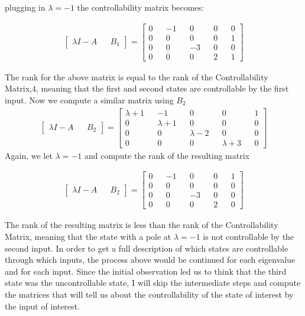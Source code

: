 \documentclass[paper=a4,margin, fontsize=11pt]{scrartcl} %
\numberwithin{equation}{section} %
\numberwithin{figure}{section} %
\numberwithin{table}{section} %
\begin{document}
plugging in $\lambda=-1$ the controllability matrix becomes:

\begin{align*}
\begin{bmatrix}\lambda I-A && B_1\end{bmatrix}=\begin{bmatrix} 0 && -1 && 0 && 0 && 0\\0 && 0 && 0 && 0 && 1\\0 && 0 && -3 && 0 && 0\\0 && 0 && 0 && 2 && 1\end{bmatrix}
\end{align*}

The rank for the above matrix is equal to the rank of the Controllability Matrix,4, meaning that the first and second states are controllable by the first input. Now we compute a similar matrix using $B_2$\\

\begin{align*}
\begin{bmatrix}\lambda I-A && B_2\end{bmatrix}=\begin{bmatrix} \lambda+1 && -1 && 0 && 0 && 1\\0 && \lambda+1 && 0 && 0 && 0\\0 && 0 && \lambda-2 && 0 && 0\\0 && 0 && 0 && \lambda+3 && 0\end{bmatrix}
\end{align*}
Again, we let $\lambda=-1$ and compute the rank of the resulting matrix

\begin{align*}
\begin{bmatrix}\lambda I-A && B_2\end{bmatrix}=\begin{bmatrix} 0 && -1 && 0 && 0 && 1\\0 && 0 && 0 && 0 && 0\\0 && 0 && -3 && 0 && 0\\0 && 0 && 0 && 2 && 0\end{bmatrix}
\end{align*}

The rank of the resulting matrix is less than the rank of the Controllability Matrix, meaning that the state with a pole at $\lambda=-1$ is not controllable by the second input.  In order to get a full description of which states are controllable through which inputs, the process above would be continued for each eigenvalue and for each input.  Since the initial observation led us to think that the third state was the uncontrollable state, I will skip the intermediate steps and compute the matrices that will tell us about the controllability of the state of interest by the input of interest.\\
\end{document}

